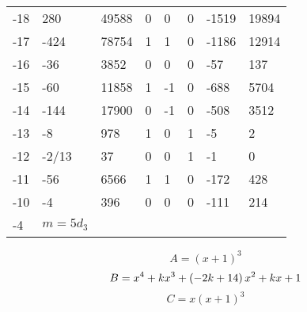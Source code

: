\documentclass{amsart}
\begin{document}
\begin{longtable}{|l|l|l|lllll|}
-18&280&49588&0&0&0&-1519&19894\\
-17&-424&78754&1&1&0&-1186&12914\\
-16&-36&3852&0&0&0&-57&137\\
-15&-60&11858&1&-1&0&-688&5704\\
-14&-144&17900&0&-1&0&-508&3512\\
-13&-8&978&1&0&1&-5&2\\
-12&-2/13&37&0&0&1&-1&0\\
-11&-56&6566&1&1&0&-172&428\\
-10&-4&396&0&0&0&-111&214\\
-4&$m=5d_{3}$&&\multicolumn{5}{c|}{}\\
\hline
\end{longtable}
$$A=(x
 + 1)^{3}$$
$$B=x^4
 + k\*x^3
 + \left(-2\*k
 + 14\right) \*x^2
 + k\*x
 + 1$$
$$C=x(x
 + 1)^{3}$$
\end{document}
